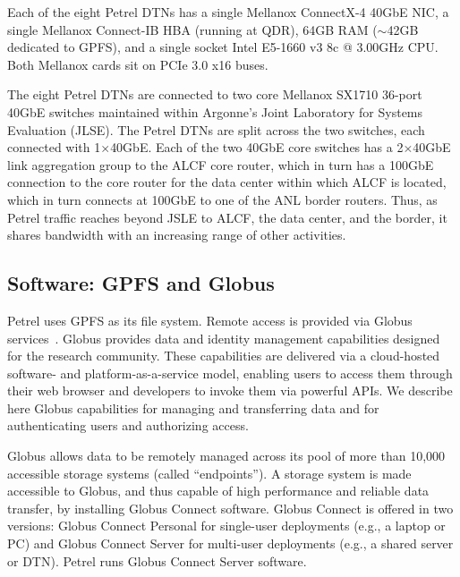 \documentclass[sigconf]{acmart}
\begin{document}
Each of the eight Petrel DTNs has a single Mellanox ConnectX-4 40GbE NIC, a single Mellanox Connect-IB HBA (running at QDR), 64GB RAM ($\sim$42GB dedicated to GPFS), and a single socket Intel E5-1660 v3 8c @ 3.00GHz CPU. 
Both Mellanox cards sit on PCIe 3.0 x16 buses.

The eight Petrel DTNs are connected to two core Mellanox SX1710 36-port 40GbE switches
maintained within Argonne's Joint Laboratory for Systems Evaluation (JLSE).
The Petrel DTNs are split across the two switches, each connected with 1$\times$40GbE. 
Each of the two 40GbE core switches has a 2$\times$40GbE link aggregation group to the ALCF core router, which in turn has a 100GbE connection to the core router for the data center within
which ALCF is located,
which in turn connects at 100GbE to one of the ANL border routers.
Thus, as Petrel traffic reaches beyond JSLE to ALCF, the data center, and the border,
it shares bandwidth with an increasing range of other activities.

\subsection{Software: GPFS and Globus}

Petrel uses GPFS as its file system. 
Remote access is provided via Globus services~\cite{Globus2016}.
Globus provides data and identity management capabilities designed for the research community. 
These capabilities are delivered via a cloud-hosted software- and platform-as-a-service model, 
enabling users to access them through their web browser and
developers to invoke them via powerful APIs. 
We describe here Globus capabilities for managing and transferring data and for authenticating users and authorizing access.

Globus allows data to be remotely managed across its pool of more than 10,000 accessible storage systems (called ``endpoints''). 
A storage system is made accessible to Globus, and thus capable of high performance and reliable data transfer, by installing Globus Connect software. 
Globus Connect is offered in two versions: 
Globus Connect Personal for single-user deployments (e.g., a laptop or PC) and Globus Connect Server for multi-user
deployments (e.g., a shared server or DTN). 
Petrel runs Globus Connect Server software.
\end{document}
